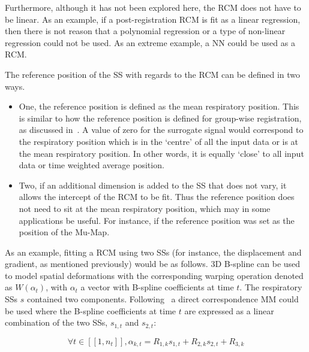                 Furthermore, although it has not been explored here, the \gls{RCM} does not have to be linear. As an example, if a post-registration \gls{RCM} is fit as a linear regression, then there is not reason that a polynomial regression or a type of non-linear regression could not be used. As an extreme example, a \gls{NN} could be used as a \gls{RCM}.
                
                The reference position of the \gls{SS} with regards to the \gls{RCM} can be defined in two ways.
            
                \begin{itemize}
                    \item One, the reference position is defined as the mean respiratory position. This is similar to how the reference position is defined for group-wise registration, as discussed in~. A value of zero for the surrogate signal would correspond to the respiratory position which is in the `centre' of all the input data or is at the mean respiratory position. In other words, it is equally `close' to all input data or time weighted average position.
                    
                    \item Two, if an additional dimension is added to the \gls{SS} that does not vary, it allows the intercept of the \gls{RCM} to be fit. Thus the reference position does not need to sit at the mean respiratory position, which may in some applications be useful. For instance, if the reference position was set as the position of the \gls{Mu-Map}.
                \end{itemize}
                
                As an example, fitting a \gls{RCM} using two \glspl{SS} (for instance, the displacement and gradient, as mentioned previously) would be as follows. \gls{3D} B-spline can be used to model spatial deformations with the corresponding warping operation denoted as $W(\alpha_t)$, with $\alpha_t$ a vector with B-spline coefficients at time $t$. The respiratory \glspl{SS} $s$ contained two components. Following~\parencite{McClelland2013} a direct correspondence \gls{MM} could be used where the B-spline coefficients at time $t$ are expressed as a linear combination of the two \glspl{SS}, $s_{1,t}$ and $s_{2,t}$:
            
                \begin{equation}\label{eq:respiratory_correspondence_model_motion_parameters}
                    \forall t \in [[1, n_t]], \alpha_{k, t} = R_{1, k} s_{1, t} + R_{2, k} s_{2, t} + R_{3, k}
                \end{equation}
                
